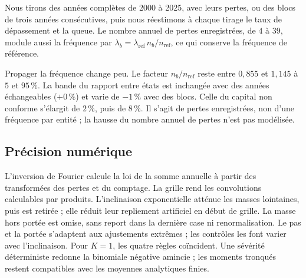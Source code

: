 Nous tirons des années complètes de 2000 à 2025, avec leurs pertes, ou des blocs de trois années
consécutives, puis nous réestimons à chaque tirage le taux de dépassement et la queue. Le nombre
annuel de pertes enregistrées, de $4$ à $39$, module aussi la fréquence par
$\lambda_b=\lambda_{\mathrm{ref}}\,n_b/n_{\mathrm{ref}}$, ce qui conserve la fréquence de référence.



Propager la fréquence change peu. Le facteur $n_b/n_{\mathrm{ref}}$ reste entre $0{,}855$ et
$1{,}145$ à $5$ et $95\,\%$. La bande du rapport entre états est inchangée avec des années
échangeables ($+0\,\%$) et varie de $-1\,\%$ avec des blocs. Celle du capital non conforme
s'élargit de $2\,\%$, puis de $8\,\%$. Il s'agit de pertes enregistrées, non d'une fréquence par
entité ; la hausse du nombre annuel de pertes n'est pas modélisée.

\subsection{Précision numérique}
\label{sec:institut-fourier-controles}

L'inversion de Fourier calcule la loi de la somme annuelle à partir des transformées des pertes et du comptage. La grille rend les convolutions calculables par produits. L'inclinaison exponentielle atténue les masses lointaines, puis est retirée ; elle réduit leur repliement artificiel en début de grille. La masse hors portée
est omise, sans report dans la dernière case ni renormalisation. Le pas et la portée
s'adaptent aux ajustements extrêmes ; les contrôles les font varier avec l'inclinaison.
Pour $K=1$, les quatre règles coïncident. Une sévérité déterministe redonne la
binomiale négative amincie ; les moments tronqués restent compatibles avec les
moyennes analytiques finies.
